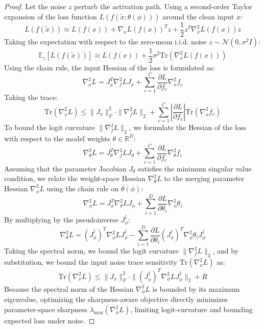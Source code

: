 \documentclass{article}
\theoremstyle{plain}
\theoremstyle{definition}
\theoremstyle{remark}
\begin{document}
\begin{proof}
Let the noise $z$ perturb the activation path. Using a second-order Taylor expansion of the loss function $L(f(\tilde{x}; \theta(\phi)))$ around the clean input $x$:
\begin{equation}
L(f(\tilde{x})) \approx L(f(x)) + \nabla_x L(f(x))^T z + \frac{1}{2} z^T \nabla^2_x L(f(x)) z
\end{equation}
Taking the expectation with respect to the zero-mean i.i.d. noise $z \sim \mathcal{N}(0, \sigma^2 I)$:
\begin{equation}
\mathbb{E}_z [L(f(\tilde{x}))] \approx L(f(x)) + \frac{1}{2} \sigma^2 \text{Tr}(\nabla^2_x L(f(x)))
\end{equation}
Using the chain rule, the input Hessian of the loss is formulated as:
\begin{equation}
\nabla^2_x L = J^T_x \nabla^2_f L J_x + \sum_{c=1}^C \frac{\partial L}{\partial f_c} \nabla^2_x f_c
\end{equation}
Taking the trace:
\begin{equation}
\text{Tr}(\nabla^2_x L) \le \|J_x\|^2_F \cdot \|\nabla^2_f L\|_2 + \sum_{c=1}^C \left| \frac{\partial L}{\partial f_c} \right| \text{Tr}(\nabla^2_x f_c)
\end{equation}
To bound the logit curvature $\|\nabla^2_f L\|_2$, we formulate the Hessian of the loss with respect to the model weights $\theta \in \mathbb{R}^D$:
\begin{equation}
\nabla^2_\theta L = J^T_\theta \nabla^2_f L J_\theta + \sum_{c=1}^C \frac{\partial L}{\partial f_c} \nabla^2_\theta f_c
\end{equation}
Assuming that the parameter Jacobian $J_\theta$ satisfies the minimum singular value condition, we relate the weight-space Hessian $\nabla^2_\theta L$ to the merging parameter Hessian $\nabla^2_\phi L$ using the chain rule on $\theta(\phi)$:
\begin{equation}
\nabla^2_\phi L = J^T_\phi \nabla^2_\theta L J_\phi + \sum_{i=1}^D \frac{\partial L}{\partial \theta_i} \nabla^2_\phi \theta_i
\end{equation}
By multiplying by the pseudoinverse $J^\dagger_\phi$:
\begin{equation}
\nabla^2_\theta L = (J^\dagger_\phi)^T \nabla^2_\phi L J^\dagger_\phi - \sum_{i=1}^D \frac{\partial L}{\partial \theta_i} (J^\dagger_\phi)^T \nabla^2_\phi \theta_i J^\dagger_\phi
\end{equation}
Taking the spectral norm, we bound the logit curvature $\|\nabla^2_f L\|_2$, and by substitution, we bound the input noise trace sensitivity $\text{Tr}(\nabla^2_x L)$ as:
\begin{equation}
\text{Tr}(\nabla^2_x L) \le \|J_x\|^2_F \cdot \|(J^\dagger_\phi)^T \nabla^2_\phi L J^\dagger_\phi\|_2 + R
\end{equation}
Because the spectral norm of the Hessian $\nabla^2_\phi L$ is bounded by its maximum eigenvalue, optimizing the sharpness-aware objective directly minimizes parameter-space sharpness $\lambda_{\text{max}}(\nabla^2_\phi L)$, limiting logit-curvature and bounding expected loss under noise.
\end{proof}
\end{document}
